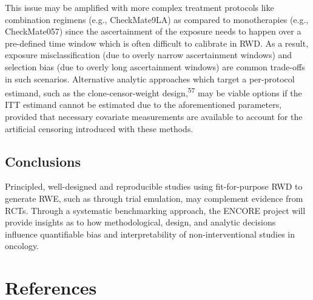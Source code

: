 \documentclass[
  letterpaper,
  DIV=11,
  numbers=noendperiod]{scrartcl}
\begin{document}
This issue may be amplified with more complex treatment protocols like
combination regimens (e.g., CheckMate9LA) as compared to monotherapies
(e.g., CheckMate057) since the ascertainment of the exposure needs to
happen over a pre-defined time window which is often difficult to
calibrate in RWD. As a result, exposure misclassification (due to overly
narrow ascertainment windows) and selection bias (due to overly long
ascertainment windows) are common trade-offs in such scenarios.
Alternative analytic approaches which target a per-protocol estimand,
such as the clone-censor-weight design,\textsuperscript{57} may be
viable options if the ITT estimand cannot be estimated due to the
aforementioned parameters, provided that necessary covariate
measurements are available to account for the artificial censoring
introduced with these methods.

\subsection{Conclusions}\label{conclusions}

Principled, well-designed and reproducible studies using fit-for-purpose
RWD to generate RWE, such as through trial emulation, may complement
evidence from RCTs. Through a systematic benchmarking approach, the
ENCORE project will provide insights as to how methodological, design,
and analytic decisions influence quantifiable bias and interpretability
of non-interventional studies in oncology.

\newpage{}

\section*{References}\label{references}
\end{document}
